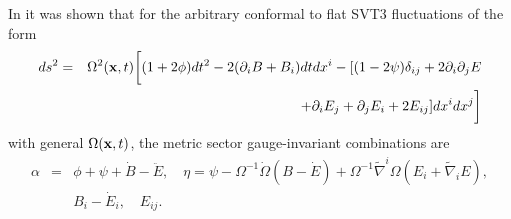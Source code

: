 In \cite{amarasinghe_2019} it was shown that for the arbitrary conformal to flat SVT3 fluctuations of the form
%
\begin{eqnarray}
ds^2 &=&\Omega^2({\bf x},t)\bigg[(1+2\phi) dt^2 -2(\partial_i B +B_i)dt dx^i - [(1-2\psi)\delta_{ij} +2\partial_i\partial_j E 
\nonumber\\
&&+ \partial_i E_j + \partial_j E_i + 2E_{ij}]dx^i dx^j\bigg]
\label{14.5}
\end{eqnarray}
%
with general $\Omega({\bf x},t)$, the metric sector gauge-invariant combinations are
%
\begin{eqnarray}
\alpha &=& \phi +\psi+\dot B - \ddot E, \quad \eta=\psi -\Omega^{-1}\dot{\Omega}(B-\dot E)+\Omega^{-1}\tilde\nabla^i\Omega(E_i+\tilde\nabla_i E),
\nonumber\\
&& B_i-\dot E_i,\quad E_{ij}.
\label{14.6}
\end{eqnarray}
%
